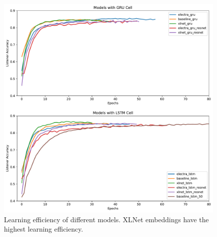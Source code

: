 \begin{figure}[ht]
\centering
\includegraphics[scale=0.465]{assets/learning.pdf}
\caption[Learning]{Learning efficiency of different models. XLNet embeddings have the highest learning efficiency.}
\label{figure:learning}
\end{figure}
